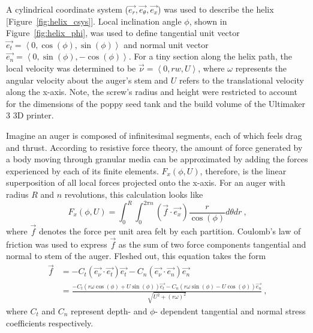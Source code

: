 \documentclass[letterpaper, 11 pt]{article}
\begin{document}
A cylindrical coordinate system ($\vec{e_r}, \vec{e_\theta}, \vec{e_x}$) was used to describe the helix [Figure~\ref{fig:helix_csys}]. Local inclination angle $\phi$, shown in Figure~\ref{fig:helix_phi}, was used to define tangential unit vector $\vec{e_t} = \left\langle 0, \cos(\phi),\sin(\phi)\right\rangle $ and normal unit vector $\vec{e_n} = \left\langle 0, \sin(\phi), -\cos(\phi)\right\rangle $. For a tiny section along the helix path, the local velocity was determined to be $\vec{\nu} = \left\langle 0, rw, U\right\rangle $, where $\omega$ represents the angular velocity about the auger's stem and $U$ refers to the translational velocity along the x-axis. Note, the screw's radius and height were restricted to account for the dimensions of the poppy seed tank and the build volume of the Ultimaker 3 3D printer.  

Imagine an auger is composed of infinitesimal segments, each of which feels drag and thrust. According to resistive force theory, the amount of force generated by a body moving through granular media can be approximated by adding the forces experienced by each of its finite elements. $F_x(\phi,U)$, therefore, is the linear superposition of all local forces projected onto the x-axis. For an auger with radius $R$ and $n$ revolutions, this calculation looks like
\begin{equation}\label{FxBasic}
F_x(\phi,U) = \int_{0}^{R}\int_{0}^{2\pi n} (\vec{f}\cdot\vec{e_x})\frac{r}{\cos(\phi)} d\theta dr\ \text{,}
\end{equation}
where $\vec{f}$ denotes the force per unit area felt by each partition. Coulomb's law of friction was used to express $\vec{f}$ as the sum of two force components tangential and normal to stem of the auger. Fleshed out, this equation takes the form
\begin{equation}\label{f}
\begin{split} 
\vec{f} &= -C_t(\vec{e_\nu}\cdot\vec{e_t})\vec{e_t}-C_n(\vec{e_\nu}\cdot\vec
{e_n})\vec{e_n} \\
&=\frac{-C_t(r\omega\cos(\phi)+U\sin(\phi))\vec{e_t}-C_n(r\omega\sin(\phi)-U\cos(\phi))\vec{e_n}}{\sqrt{U^2+(r\omega)^2}}\ \text{,}
\end{split} 
\end{equation}
where $C_t$ and $C_n$ represent depth- and $\phi$- dependent tangential and normal stress coefficients respectively. 
\end{document}
